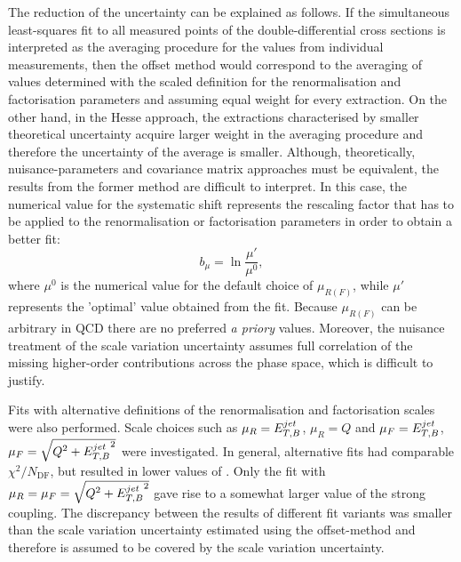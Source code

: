 The reduction of the \asz uncertainty can be explained as follows. If the simultaneous least-squares fit to all measured points of the double-differential cross sections is interpreted as the averaging procedure for the \asz values from individual measurements, then the offset method would correspond to the averaging of \asz values determined with the scaled definition for the renormalisation and factorisation parameters and assuming equal weight for every extraction. On the other hand, in the Hesse approach, the extractions characterised by smaller theoretical uncertainty acquire larger weight in the averaging procedure and therefore the uncertainty of the average \asz is smaller. Although, theoretically, nuisance-parameters and covariance matrix approaches must be equivalent, the results from the former method are difficult to interpret. In this case, the numerical value for the systematic shift represents the rescaling factor that has to be applied to the renormalisation or factorisation parameters in order to obtain a better fit:
\begin{equation}
 b_{\mu} = \ln{\frac{\mu'}{\mu^0}},
\end{equation}
where $\mu^{0}$ is the numerical value for the default choice of $\mu_{R(F)}$, while $\mu'$ represents the 'optimal' value obtained from the fit. Because $\mu_{R(F)}$ can be arbitrary in QCD there are no preferred \textit{a priory} values. Moreover, the nuisance treatment of the scale variation uncertainty assumes full correlation of the missing higher-order contributions across the phase space, which is difficult to justify.

Fits with alternative definitions of the renormalisation and factorisation scales were also performed. Scale choices such as $\mu_R=\mbox{$E_{T,B}^{jet}$}$, $\mu_R=Q$ and $\mu_F=\mbox{$E_{T,B}^{jet}$}$, $\mu_F=\sqrt{\mbox{${Q^2}$}+\mbox{$E_{T,B}^{jet}$}^2}$ were investigated. In general, alternative fits had comparable $\chi^2/N_\text{DF}$, but resulted in lower values of \asz. Only the fit with $\mu_R=\mu_F=\sqrt{\mbox{${Q^2}$}+\mbox{$E_{T,B}^{jet}$}^2}$ gave rise to a somewhat larger value of the strong coupling. The discrepancy between the results of different fit variants was smaller than the scale variation uncertainty estimated using the offset-method and therefore is assumed to be covered by the scale variation uncertainty.

